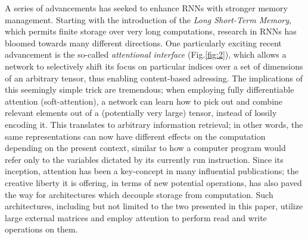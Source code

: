 \documentclass[]{article}
\begin{document}
A series of advancements has seeked to enhance RNNs with stronger memory management. Starting with the introduction of the \textit{Long Short-Term Memory}\cite{Hochreiter:1997:LSM:1246443.1246450,Gers99learningto}, which permits finite storage over very long computations, research in RNNs has bloomed towards many different directions. One particularly exciting recent advancement is the so-called \textit{attentional interface}\cite{NIPS2014_5542,Bahdanau} (Fig.\ref{fig:2}), which allows a network to selectively shift its focus on particular indices over a set of dimensions of an arbitrary tensor, thus enabling content-based adressing. The implications of this seemingly simple trick are tremendous; when employing fully differentiable attention (soft-attention), a network can learn how to pick out and combine relevant elements out of a (potentially very large) tensor, instead of lossily encoding it. This translates to arbitrary information retrieval; in other words, the same representations can now have different effects on the computation depending on the present context, similar to how a computer program would refer only to the variables dictated by its currently run instruction\cite{NIPS2014_5346}. Since its inception, attention has been a key-concept in many influential publications; the creative liberty it is offering, in terms of new potential operations, has also paved the way for architectures which decouple storage from computation. Such architectures, including but not limited to the two presented in this paper, utilize large external matrices and employ attention to perform read and write operations on them.
\end{document}
